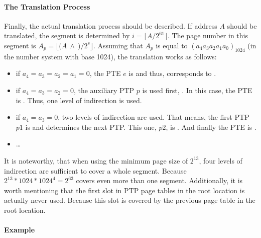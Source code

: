\paragraph{The Translation Process}

Finally, the actual translation process should be described. If address $A$ should be translated, the segment is determined by $i = \lfloor A / 2^{61} \rfloor$. The page number in this segment is $A_p = \lfloor (A~\land~$$) / 2^s \rfloor$. Assuming that $A_p$ is equal to $(a_4a_3a_2a_1a_0)_{1024}$ (in the number system with base 1024), the translation works as follows:
\begin{itemize}
	\item if $a_4=a_3=a_2=a_1=0$, the PTE $e$ is  and thus,  corresponds to .
	\item if $a_4=a_3=a_2=0$, the auxiliary PTP $p$ is used first, \ie {}. In this case, the PTE is . Thus, one level of indirection is used.
	\item if $a_4=a_3=0$, two levels of indirection are used. That means, the first PTP $p1$ is  and determines the next PTP. This one, $p2$, is . And finally the PTE is .
	\item \dots
\end{itemize}
\citep[pg. 36]{mmix-doc} It is noteworthy, that when using the minimum page size of $2^{13}$, four levels of indirection are sufficient to cover a whole segment. Because $2^{13} * 1024 * 1024^4 = 2^{63}$ covers even more than one segment. Additionally, it is worth mentioning that the first slot in PTP page tables in the root location is actually never used. Because this slot is covered by the previous page table in the root location.

\paragraph{Example}

